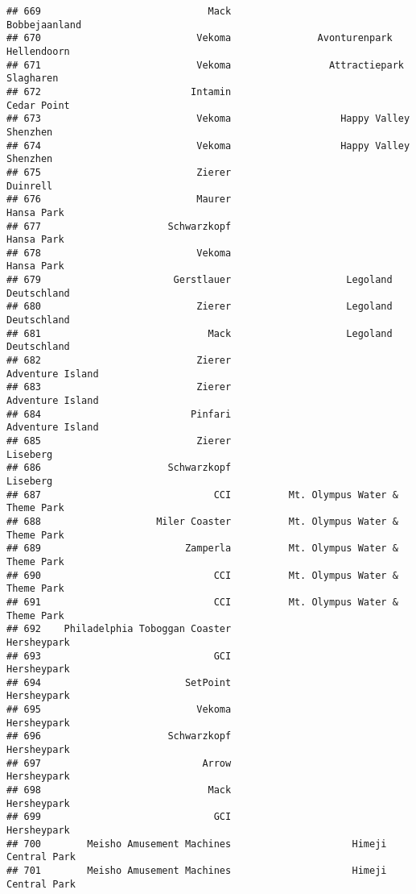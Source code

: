 \documentclass[
]{article}
\begin{document}
\begin{verbatim}
## 669                             Mack                           Bobbejaanland
## 670                           Vekoma               Avonturenpark Hellendoorn
## 671                           Vekoma                 Attractiepark Slagharen
## 672                          Intamin                             Cedar Point
## 673                           Vekoma                   Happy Valley Shenzhen
## 674                           Vekoma                   Happy Valley Shenzhen
## 675                           Zierer                                Duinrell
## 676                           Maurer                              Hansa Park
## 677                      Schwarzkopf                              Hansa Park
## 678                           Vekoma                              Hansa Park
## 679                       Gerstlauer                    Legoland Deutschland
## 680                           Zierer                    Legoland Deutschland
## 681                             Mack                    Legoland Deutschland
## 682                           Zierer                        Adventure Island
## 683                           Zierer                        Adventure Island
## 684                          Pinfari                        Adventure Island
## 685                           Zierer                                Liseberg
## 686                      Schwarzkopf                                Liseberg
## 687                              CCI          Mt. Olympus Water & Theme Park
## 688                    Miler Coaster          Mt. Olympus Water & Theme Park
## 689                         Zamperla          Mt. Olympus Water & Theme Park
## 690                              CCI          Mt. Olympus Water & Theme Park
## 691                              CCI          Mt. Olympus Water & Theme Park
## 692    Philadelphia Toboggan Coaster                             Hersheypark
## 693                              GCI                             Hersheypark
## 694                         SetPoint                             Hersheypark
## 695                           Vekoma                             Hersheypark
## 696                      Schwarzkopf                             Hersheypark
## 697                            Arrow                             Hersheypark
## 698                             Mack                             Hersheypark
## 699                              GCI                             Hersheypark
## 700        Meisho Amusement Machines                     Himeji Central Park
## 701        Meisho Amusement Machines                     Himeji Central Park

\end{verbatim}
\end{document}

